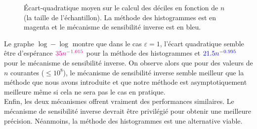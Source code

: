 \begin{figure}[H]
    \centering
    \hfill
    \hfill
    \caption{Écart-quadratique moyen sur le calcul des déciles en fonction de \(n\) (la taille de l'échantillon). La méthode des histogrammes est en {\color{magenta} magenta} et le mécanisme de sensibilité inverse est en {\color{blue} bleu}.}
\end{figure}

Le graphe \(\log-\log\) montre que dans le cas \(\varepsilon = 1\), l'écart quadratique semble être d’espérance \(\color{magenta} 35n^{-1.015}\) pour la méthode des histogrammes et \(\color{blue} 21.5n^{-0.995}\) pour le mécanisme de sensibilité inverse. On observe alors que pour des valeurs de \(n\) courantes (\(\leq 10^8\)), le mécanisme de sensibilité inverse semble meilleur que la méthode que nous avons introduite et que notre méthode est asymptotiquement meilleure même si cela ne sera pas le cas en pratique.\\

Enfin, les deux mécanismes offrent vraiment des performances similaires. Le mécanisme de sensibilité inverse devrait être privilégié pour obtenir une meilleure précision. Néanmoins, la méthode des histogrammes est une alternative viable.

